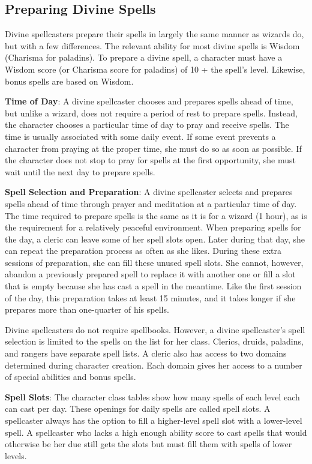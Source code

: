 \subsection{Preparing Divine Spells}

				
Divine spellcasters prepare their spells in largely the same manner as wizards do, but with a few differences. The relevant ability for most divine spells is Wisdom (Charisma for paladins). To prepare a divine spell, a character must have a Wisdom score (or Charisma score for paladins) of 10 + the spell's level. Likewise, bonus spells are based on Wisdom.
				
\textbf{Time of Day}: A divine spellcaster chooses and prepares spells ahead of time, but unlike a wizard, does not require a period of rest to prepare spells. Instead, the character chooses a particular time of day to pray and receive spells. The time is usually associated with some daily event. If some event prevents a character from praying at the proper time, she must do so as soon as possible. If the character does not stop to pray for spells at the first opportunity, she must wait until the next day to prepare spells.
				
\textbf{Spell Selection and Preparation}: A divine spellcaster selects and prepares spells ahead of time through prayer and meditation at a particular time of day. The time required to prepare spells is the same as it is for a wizard (1 hour), as is the requirement for a relatively peaceful environment. When preparing spells for the day, a cleric can leave some of her spell slots open. Later during that day, she can repeat the preparation process as often as she likes. During these extra sessions of preparation, she can fill these unused spell slots. She cannot, however, abandon a previously prepared spell to replace it with another one or fill a slot that is empty because she has cast a spell in the meantime. Like the first session of the day, this preparation takes at least 15 minutes, and it takes longer if she prepares more than one-quarter of his spells.
				
Divine spellcasters do not require spellbooks. However, a divine spellcaster's spell selection is limited to the spells on the list for her class. Clerics, druids, paladins, and rangers have separate spell lists. A cleric also has access to two domains determined during character creation. Each domain gives her access to a number of special abilities and bonus spells.
				
\textbf{Spell Slots}: The character class tables show how many spells of each level each can cast per day. These openings for daily spells are called spell slots. A spellcaster always has the option to fill a higher-level spell slot with a lower-level spell. A spellcaster who lacks a high enough ability score to cast spells that would otherwise be her due still gets the slots but must fill them with spells of lower levels. 
				
